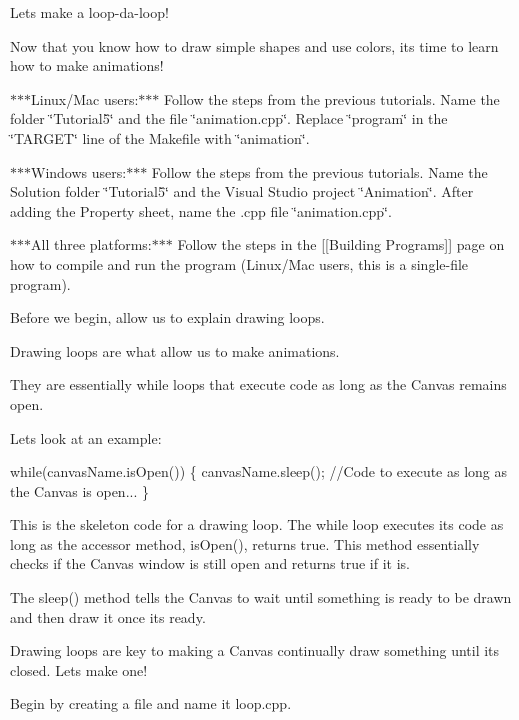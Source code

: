 Let\textquotesingle{}s make a loop-\/da-\/loop!

Now that you know how to draw simple shapes and use colors, it\textquotesingle{}s time to learn how to make animations!

$\ast$$\ast$$\ast$\+Linux/\+Mac users\+:$\ast$$\ast$$\ast$ Follow the steps from the previous tutorials. Name the folder \char`\"{}\+Tutorial5\char`\"{} and the file \char`\"{}animation.\+cpp\char`\"{}. Replace \char`\"{}program\char`\"{} in the \char`\"{}\+T\+A\+R\+G\+E\+T\char`\"{} line of the Makefile with \char`\"{}animation\char`\"{}.

$\ast$$\ast$$\ast$\+Windows users\+:$\ast$$\ast$$\ast$ Follow the steps from the previous tutorials. Name the Solution folder \char`\"{}\+Tutorial5\char`\"{} and the Visual Studio project \char`\"{}\+Animation\char`\"{}. After adding the Property sheet, name the .cpp file \char`\"{}animation.\+cpp\char`\"{}.

$\ast$$\ast$$\ast$\+All three platforms\+:$\ast$$\ast$$\ast$ Follow the steps in the \mbox{[}\mbox{[}Building Programs\mbox{]}\mbox{]} page on how to compile and run the program (Linux/\+Mac users, this is a single-\/file program).

Before we begin, allow us to explain drawing loops.

Drawing loops are what allow us to make animations.

They are essentially while loops that execute code as long as the Canvas remains open.

Let\textquotesingle{}s look at an example\+:


\begin{DoxyCode}
\textcolor{keywordflow}{while}(canvasName.isOpen()) \{
   canvasName.sleep();
  \textcolor{comment}{//Code to execute as long as the Canvas is open...}
\}
\end{DoxyCode}
 This is the skeleton code for a drawing loop. The while loop executes its code as long as the accessor method, is\+Open(), returns {\ttfamily true}. This method essentially checks if the Canvas window is still open and returns {\ttfamily true} if it is.

The sleep() method tells the Canvas to wait until something is ready to be drawn and then draw it once its ready.

Drawing loops are key to making a Canvas continually draw something until its closed. Let\textquotesingle{}s make one!

Begin by creating a file and name it loop.\+cpp.


